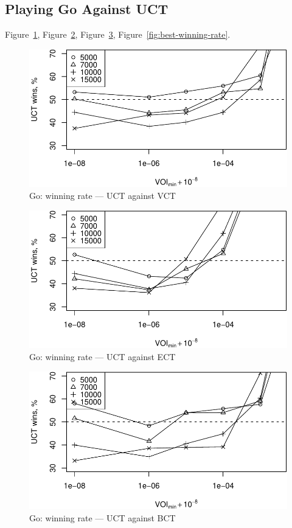 \documentclass{article}
\begin{document}
\subsection{Playing Go Against UCT}

Figure~\ref{fig:uct-against-vct}, Figure~\ref{fig:uct-against-ect}, Figure~\ref{fig:uct-against-bct},
Figure~\ref{fig:best-winning-rate}.

\begin{figure}[h]
\centering
\includegraphics[scale=0.8]{vct-wins.pdf}
\caption{Go: winning rate --- UCT against VCT}
\label{fig:uct-against-vct}
\end{figure}

\begin{figure}[h]
\centering
\includegraphics[scale=0.8]{ect-wins.pdf}
\caption{Go: winning rate --- UCT against ECT}
\label{fig:uct-against-ect}
\end{figure}

\begin{figure}[h]
\centering
\includegraphics[scale=0.8]{bct-wins.pdf}
\caption{Go: winning rate --- UCT against BCT}
\label{fig:uct-against-bct}
\end{figure}
\end{document}
